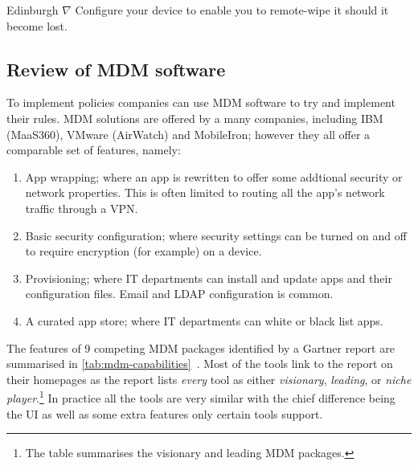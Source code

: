 \documentclass[thesis.tex]{subfiles}
\begin{document}
\begin{policyrule}{Edinburgh}
  $\nabla$ Configure your device to enable you to remote-wipe it should it become lost.
\end{policyrule}


\subsection{Review of MDM software}

To implement policies companies can use \ac{MDM} software to try and implement
their rules.  \ac{MDM} solutions are offered by a many companies, including IBM
(MaaS360), VMware (AirWatch) and MobileIron; however they all offer a
comparable set of features, namely:
\begin{enumerate}
\item App wrapping; where an app is rewritten to offer some addtional security
  or network properties. This is often limited to routing all the app's
  network traffic through a VPN.
\item Basic security configuration; where security settings can be turned on and
  off to require encryption (for example) on a device.
\item Provisioning; where IT departments can install and update apps and
  their configuration files. Email and LDAP configuration is common.
\item A curated app store; where IT departments can white or black list apps.
\end{enumerate}

The features of 9 competing MDM packages identified by a Gartner report are
summarised in \autoref{tab:mdm-capabilities}~\cite{rob_smith_magic_2016}.  Most
of the tools link to the report on their homepages as the report lists \emph{every} tool as
either \emph{visionary}, \emph{leading}, or \emph{niche player}.\footnote{The
  table summarises the visionary and leading MDM packages.}  In practice all the
tools are very similar with the chief difference being the UI as well as some
extra features only certain tools support.
\end{document}
